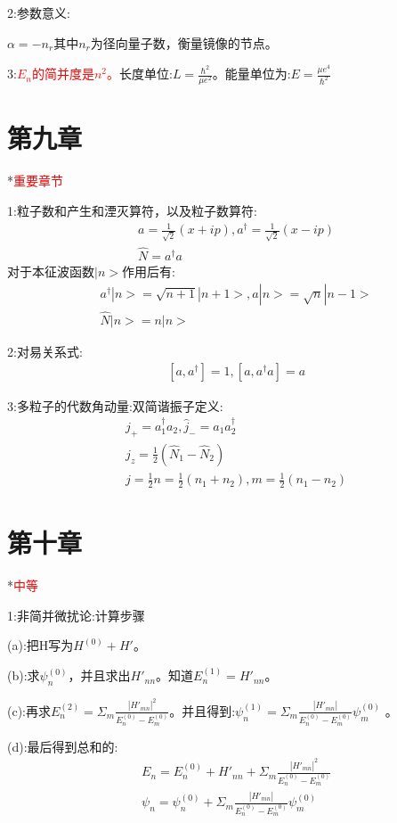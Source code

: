 \documentclass[10pt,journal,compsoc]{IEEEtran}
\begin{document}
2:参数意义:

$\alpha=-n_r$其中$n_r$为径向量子数，衡量镜像的节点。

3:\textcolor{red}{$E_n$的简并度是$n^2$。}长度单位:$L=\frac{\hbar^2}{\mu e^2} $。能量单位为:$E=\frac{\mu e^4}{\hbar^2} $

\section{第九章}
*\textcolor{red}{重要章节}

1:粒子数和产生和湮灭算符，以及粒子数算符:
\begin{align}
  & a = \frac1{\sqrt{2}}(x+ip),a^{\dagger}=\frac1{\sqrt{2}}(x-ip)\\
  & \hat N=a^{\dagger}a
\end{align}
对于本征波函数$|n>$作用后有:
\begin{align}
  & a^{\dagger}|n>=\sqrt{n+1}|n+1>,a|n>=\sqrt{n}|n-1>\\
  & \hat N |n>=n|n>
\end{align}

2:对易关系式:
\begin{align}
  & [a,a^{\dagger}]=1,[a,a^{\dagger}a]=a
\end{align}

3:多粒子的代数角动量:双简谐振子定义:
\begin{align}
    & \hat j_+=a^{\dagger}_1a_2,\hat j_-=a_1a^{\dagger}_2\\
    & \hat j_z=\frac12(\hat N_1-\hat N_2)\\
    & j=\frac12n=\frac12(n_1+n_2) , m=\frac12(n_1-n_2)
\end{align}

\section{第十章}
*\textcolor{red}{中等}

1:非简并微扰论:计算步骤

(a):把H写为$H^{(0)}+H'$。

(b):求$\psi^{(0)}_n$，并且求出$H'_{nn}$。知道$E^{(1)}_n=H'_{nn}$。

(c):再求$E^{(2)}_n=\Sigma_m\frac{|H'_{mn}|^2}{E^{(0)}_n-E^{(0)}_m}$。并且得到:$\psi^{(1)}_n=\Sigma_m\frac{|H'_{mn}|}{E^{(0)}_n-E^{(0)}_m}\psi^{(0)}_m $ 。

(d):最后得到总和的:
\begin{align}
  & E_n=E^{(0)}_n+H'_{nn}+\Sigma_m\frac{|H'_{mn}|^2}{E^{(0)}_n-E^{(0)}_m}\\
  & \psi_n=\psi_n^{(0)}+\Sigma_m\frac{|H'_{mn}|}{E^{(0)}_n-E^{(0)}_m}\psi_m^{(0)}
\end{align}
\end{document}
